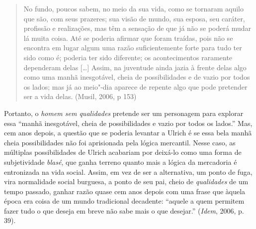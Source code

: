 \begin{quote}
No fundo, poucos sabem, no meio da sua vida, como se tornaram aquilo que
são, com seus prazeres; sua visão de mundo, sua esposa, seu caráter,
profissão e realizações, mas têm a sensação de que já não se poderá
mudar lá muita coisa. Até se poderia afirmar que foram traídas, pois não
se encontra em lugar algum uma razão suficientemente forte para tudo ter
sido como é; poderia ter sido diferente; os acontecimentos raramente
dependeram delas [\ldots{}] Assim, na juventude ainda jazia à frente
delas algo como uma manhã inesgotável, cheia de possibilidades e de
vazio por todos os lados; mas já ao meio"-dia aparece de repente algo que
pode pretender ser a vida delas. (Musil, 2006, p 153)
\end{quote}

Portanto, o \emph{homem sem qualidades} pretende ser um personagem para
explorar essa ``manhã inesgotável, cheia de possibilidades e vazio por
todos os lados.'' Mas, cem anos depois, a questão que se poderia
levantar a Ulrich é se essa bela manhã cheia possibilidades não foi
aprisionada pela lógica mercantil. Nesse caso, as múltiplas
possibilidades de Ulrich acabariam por deixá-lo como uma forma de
subjetividade \emph{blasé}, que ganha terreno quanto mais a lógica da
mercadoria é entronizada na vida social. Assim, em vez de ser a
alternativa, um ponto de fuga, vira normalidade social burguesa, a ponto
de seu pai, cheio de \emph{qualidades} de um tempo passado, ganhar razão
quase cem anos depois com uma frase que àquela época era coisa de um
mundo tradicional decadente: ``aquele a quem permitem fazer tudo o que
deseja em breve não sabe mais o que desejar.'' (\emph{Idem}, 2006, p. 39).

